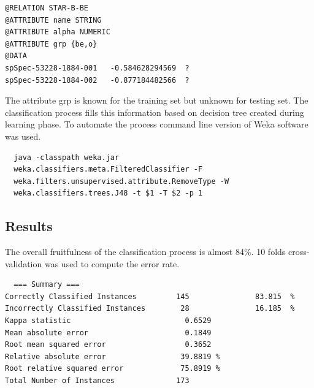 \begin{lstlisting}
@RELATION STAR-B-BE
@ATTRIBUTE name STRING
@ATTRIBUTE alpha NUMERIC
@ATTRIBUTE grp {be,o}
@DATA	 
spSpec-53228-1884-001	-0.584628294569	 ?
spSpec-53228-1884-002	-0.877184482566	 ?
\end{lstlisting}

The attribute \textrm{grp} is known for the training set but unknown
for testing set. The classification process fills this information
based on decision tree created during learning phase. To automate the
process command line version of Weka software was used.

\begin{lstlisting}
  java -classpath weka.jar
  weka.classifiers.meta.FilteredClassifier -F
  weka.filters.unsupervised.attribute.RemoveType -W
  weka.classifiers.trees.J48 -t $1 -T $2 -p 1
\end{lstlisting}

\subsection{Results}


The overall fruitfulness of the classification process is almost
84\%. 10 folds cross-validation was used to compute the error
rate. 


\begin{lstlisting}
  === Summary ===
Correctly Classified Instances         145               83.815  %
Incorrectly Classified Instances        28               16.185  %
Kappa statistic                          0.6529
Mean absolute error                      0.1849
Root mean squared error                  0.3652
Relative absolute error                 39.8819 %
Root relative squared error             75.8919 %
Total Number of Instances              173     
\end{lstlisting}

